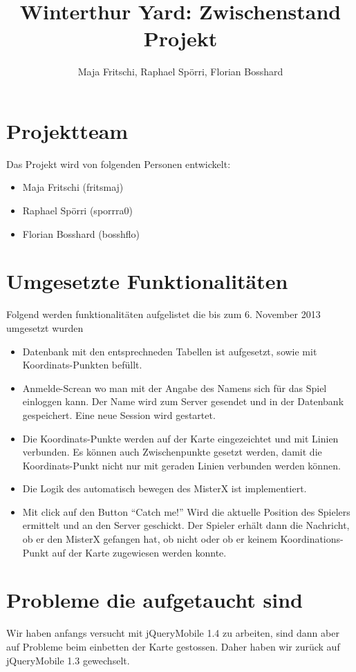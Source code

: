 \documentclass[11pt]{article}
\title{Winterthur Yard: Zwischenstand Projekt}
\author{Maja Fritschi, Raphael Spörri, Florian Bosshard}
\date{}
\begin{document}
\maketitle

\tableofcontents
\newpage

\section{Projektteam}
Das Projekt wird von folgenden Personen entwickelt:
\begin{itemize}
\item Maja Fritschi (fritsmaj)
\item Raphael Spörri (sporrra0)
\item Florian Bosshard (bosshflo)
\end{itemize}


\section{Umgesetzte Funktionalitäten}
Folgend werden funktionalitäten aufgelistet die bis zum 6. November 2013 umgesetzt wurden 
\begin{itemize}
\item Datenbank mit den entsprechneden Tabellen ist aufgesetzt, sowie mit Koordinats-Punkten befüllt.
\item Anmelde-Screan wo man mit der Angabe des Namens sich für das Spiel einloggen kann. Der Name wird zum Server gesendet und in der Datenbank gespeichert. Eine neue Session wird gestartet.
\item Die Koordinats-Punkte werden auf der Karte eingezeichtet und mit Linien verbunden. Es können auch Zwischenpunkte gesetzt werden, damit die Koordinats-Punkt nicht nur mit geraden Linien verbunden werden können.
\item Die Logik des automatisch bewegen des MisterX ist implementiert.
\item Mit click auf den Button ``Catch me!'' Wird die aktuelle Position des Spielers ermittelt und an den Server geschickt. Der Spieler erhält dann die Nachricht, ob er den MisterX gefangen hat, ob nicht oder ob er keinem Koordinations-Punkt auf der Karte zugewiesen werden konnte.
\end{itemize}


\section{Probleme die aufgetaucht sind}
Wir haben anfangs versucht mit jQueryMobile 1.4 zu arbeiten, sind dann aber auf Probleme beim einbetten der Karte gestossen. Daher haben wir zurück auf jQueryMobile 1.3 gewechselt.
\end{document}
